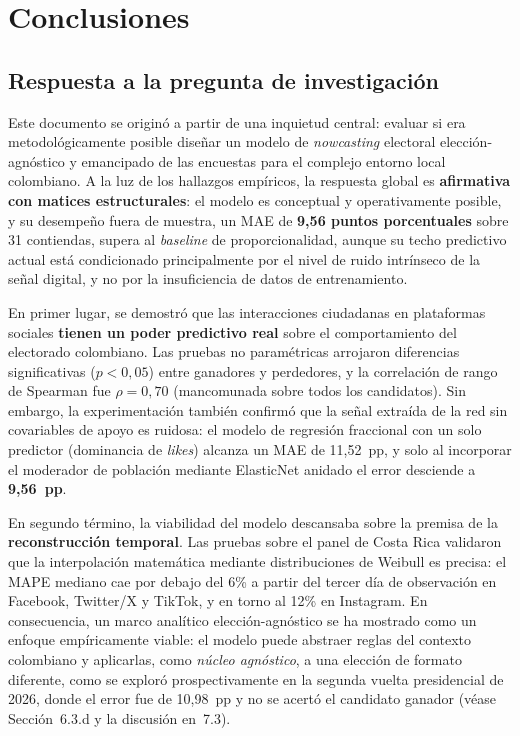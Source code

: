 

\chapter{Conclusiones}\label{ch:conclusion}

\section{Respuesta a la pregunta de investigación}

Este documento se originó a partir de una inquietud central: evaluar si era metodológicamente posible diseñar un modelo de \textit{nowcasting} electoral elección-agnóstico y emancipado de las encuestas para el complejo entorno local colombiano. A la luz de los hallazgos empíricos, la respuesta global es \textbf{afirmativa con matices estructurales}: el modelo es conceptual y operativamente posible, y su desempeño fuera de muestra, un MAE de \textbf{9{,}56 puntos porcentuales} sobre 31 contiendas, supera al \textit{baseline} de proporcionalidad, aunque su techo predictivo actual está condicionado principalmente por el nivel de ruido intrínseco de la señal digital, y no por la insuficiencia de datos de entrenamiento.

En primer lugar, se demostró que las interacciones ciudadanas en plataformas sociales \textbf{tienen un poder predictivo real} sobre el comportamiento del electorado colombiano. Las pruebas no paramétricas arrojaron diferencias significativas ($p < 0{,}05$) entre ganadores y perdedores, y la correlación de rango de Spearman fue $\rho = 0{,}70$ (mancomunada sobre todos los candidatos). Sin embargo, la experimentación también confirmó que la señal extraída de la red sin covariables de apoyo es ruidosa: el modelo de regresión fraccional con un solo predictor (dominancia de \textit{likes}) alcanza un MAE de 11{,}52~pp, y solo al incorporar el moderador de población mediante ElasticNet anidado el error desciende a \textbf{9{,}56~pp}.

En segundo término, la viabilidad del modelo descansaba sobre la premisa de la \textbf{reconstrucción temporal}. Las pruebas sobre el panel de Costa Rica validaron que la interpolación matemática mediante distribuciones de Weibull es precisa: el MAPE mediano cae por debajo del 6\% a partir del tercer día de observación en Facebook, Twitter/X y TikTok, y en torno al 12\% en Instagram. En consecuencia, un marco analítico elección-agnóstico se ha mostrado como un enfoque empíricamente viable: el modelo puede abstraer reglas del contexto colombiano y aplicarlas, como \textit{núcleo agnóstico}, a una elección de formato diferente, como se exploró prospectivamente en la segunda vuelta presidencial de 2026, donde el error fue de 10{,}98~pp y no se acertó el candidato ganador (véase Sección~6.3.d y la discusión en~7.3).

